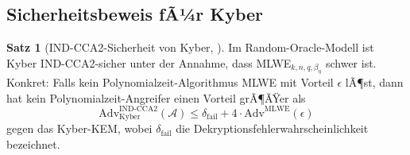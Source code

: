 ﻿\documentclass[a4paper,12pt]{article}
\theoremstyle{definition}
\newtheorem{satz}{Satz}[section]
\begin{document}
\subsection{Sicherheitsbeweis fÃ¼r Kyber}

\begin{satz}[IND-CCA2-Sicherheit von Kyber, \cite{ABD+22}]
Im Random-Oracle-Modell ist Kyber IND-CCA2-sicher unter der Annahme,
dass MLWE$_{k,n,q,\beta_\eta}$ schwer ist. Konkret: Falls kein
Polynomialzeit-Algorithmus MLWE mit Vorteil $\epsilon$ lÃ¶st, dann hat kein
Polynomialzeit-Angreifer einen Vorteil grÃ¶ÃŸer als
\[
  \mathrm{Adv}^{\mathrm{IND\text{-}CCA2}}_{\mathrm{Kyber}}(\mathcal{A}) \leq
  \delta_\mathrm{fail} + 4 \cdot \mathrm{Adv}^{\mathrm{MLWE}}(\epsilon)
\]
gegen das Kyber-KEM, wobei $\delta_\mathrm{fail}$ die Dekryptionsfehlerwahrscheinlichkeit
bezeichnet.
\end{satz}
\end{document}
